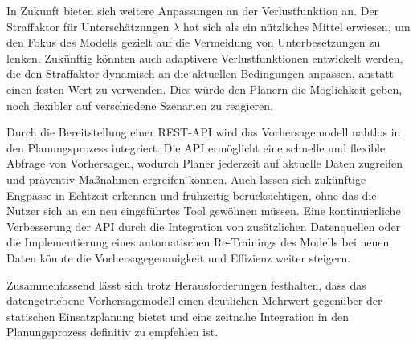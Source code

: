 \documentclass[%
pdftex,
oneside,			%
11pt,				%
parskip=half,		%
headheight = 12pt,	%
headsepline,		%
footsepline,		%
footheight = 16pt,	%
abstracton,		%
DIV=calc,		%
BCOR=8mm,		%
headinclude=false,	%
footinclude=false,	%
listof=totoc,		%
toc=bibliography,	%
]{scrreprt}	%
\begin{document}
        In Zukunft bieten sich weitere Anpassungen an der Verlustfunktion an. 
        Der Straffaktor für Unterschätzungen \( \lambda \) hat sich als ein nützliches Mittel erwiesen, um den Fokus des Modells gezielt auf die Vermeidung von Unterbesetzungen zu lenken. 
        Zukünftig könnten auch adaptivere Verlustfunktionen entwickelt werden, die den Straffaktor dynamisch an die aktuellen Bedingungen anpassen, anstatt einen festen Wert zu verwenden. 
        Dies würde den Planern die Möglichkeit geben, noch flexibler auf verschiedene Szenarien zu reagieren.

        Durch die Bereitstellung einer REST-API wird das Vorhersagemodell nahtlos in den Planungsprozess integriert.
        Die API ermöglicht eine schnelle und flexible Abfrage von Vorhersagen, wodurch Planer jederzeit auf aktuelle Daten zugreifen und präventiv Maßnahmen ergreifen können. 
        Auch lassen sich zukünftige Engpässe in Echtzeit erkennen und frühzeitig berücksichtigen, ohne das die Nutzer sich an ein neu eingeführtes Tool gewöhnen müssen.
        Eine kontinuierliche Verbesserung der API durch die Integration von zusätzlichen Datenquellen oder die Implementierung eines automatischen Re-Trainings des Modells bei neuen Daten könnte die Vorhersagegenauigkeit und Effizienz weiter steigern.
        
        Zusammenfassend lässt sich trotz Herausforderungen festhalten, dass das datengetriebene Vorhersagemodell einen deutlichen Mehrwert gegenüber der statischen Einsatzplanung bietet und eine zeitnahe Integration in den Planungsprozess definitiv zu empfehlen ist.




\cleardoublepage

\ifx\VAlterZitierstil\VTrueValue
    \printbibliography
\else
    
\fi
\end{document}
